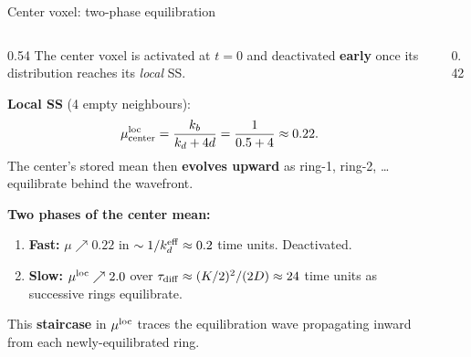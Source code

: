 \documentclass[10pt,aspectratio=169]{beamer}
\begin{document}
\begin{frame}{Center voxel: two-phase equilibration}

  \begin{columns}[T]
    \begin{column}{0.54\textwidth}
      The center voxel is activated at $t = 0$ and deactivated
      \textbf{early} once its distribution reaches its \emph{local} SS.

      \medskip
      \textbf{Local SS} (4 empty neighbours):
      \[
        \mu^{\rm loc}_{\rm center}
        = \frac{k_b}{k_d + 4d}
        = \frac{1}{0.5 + 4}
        \approx 0.22.
      \]
      The center's stored mean then \textbf{evolves upward} as ring-1,
      ring-2, \ldots equilibrate behind the wavefront.

      \bigskip
      \textbf{Two phases of the center mean:}
      \begin{enumerate}\setlength\itemsep{0.4em}
        \item \textcolor{activecolor}{\textbf{Fast:}}
              $\mu \nearrow 0.22$ in $\sim 1/k_d^{\rm eff} \approx 0.2$ time units.
              Deactivated.
        \item \textcolor{equilcolor}{\textbf{Slow:}}
              $\mu^{\rm loc} \nearrow 2.0$ over $\tau_{\rm diff} \approx (K/2)^2/(2D) \approx 24$
              time units as successive rings equilibrate.
      \end{enumerate}

      \bigskip
      This \textbf{staircase} in $\mu^{\rm loc}$ traces the equilibration
      wave propagating inward from each newly-equilibrated ring.
    \end{column}
    \begin{column}{0.42\textwidth}
      \begin{center}
\end{center}
\end{column}
\end{columns}
\end{frame}
\end{document}
